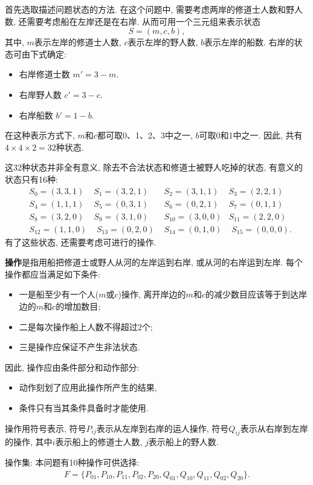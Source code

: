 \begin{result}
首先选取描述问题状态的方法. 在这个问题中, 需要考虑两岸的修道士人数和野人数, 还需要考虑船在左岸还是在右岸. 从而可用一个三元组来表示状态
         $$S=(m, c, b),$$
其中, $m$表示左岸的修道士人数, $c$表示左岸的野人数, $b$表示左岸的船数.
右岸的状态可由下式确定:
\begin{itemize}
\item 右岸修道士数  $m'=3-m$.
\item 右岸野人数   $ c'=3-c$.
\item 右岸船数      $b'=1-b$.
\end{itemize}
在这种表示方式下, $m$和$c$都可取0、1、2、3中之一, $b$可取0和1中之一. 因此, 共有$4\times 4\times 2=32$种状态.

这32种状态并非全有意义, 除去不合法状态和修道士被野人吃掉的状态, 有意义的状态只有16种:
\begin{align*}
        &S_0=(3, 3, 1)  &S_1=(3, 2, 1)     &\,\,S_2=(3, 1, 1)&S_3=(2, 2, 1)\\
        &S_4=(1, 1, 1)  &S_5=(0, 3, 1)     &\,\,S_6=(0, 2, 1)&S_7=(0, 1, 1)\\
        &S_8=(3, 2, 0)  &S_9=(3, 1, 0)     &\,\,S_{10}=(3, 0, 0)&S_{11}=(2, 2, 0)\\
        &S_{12}=(1, 1,0)&\,\,S_{13}=(0, 2, 0)  &\,\,S_{14}=(0, 1, 0)&\,\,S_{15}=(0, 0, 0).
\end{align*}
有了这些状态, 还需要考虑可进行的操作.

\textbf{操作}是指用船把修道士或野人从河的左岸运到右岸, 或从河的右岸运到左岸.
每个操作都应当满足如下条件:
\begin{itemize}
\item 一是船至少有一个人($m$或$c$)操作, 离开岸边的$m$和$c$的减少数目应该等于到达岸边的$m$和$c$的增加数目;
\item 二是每次操作船上人数不得超过2个;
\item 三是操作应保证不产生非法状态.
\end{itemize}
因此, 操作应由条件部分和动作部分:
\begin{itemize}
\item 动作刻划了应用此操作所产生的结果,
\item 条件只有当其条件具备时才能使用.
\end{itemize}
操作用符号表示, 符号$P_{ij}$表示从左岸到右岸的运人操作, 符号$Q_{ij}$表示从右岸到左岸的操作, 其中$i$表示船上的修道士人数, $j$表示船上的野人数.

操作集: 本问题有10种操作可供选择:
\begin{align}
  F=\{P_{01}, P_{10}, P_{11}, P_{02}, P_{20},Q_{01}, Q_{10}, Q_{11}, Q_{02}, Q_{20}\}.
\end{align}


\end{result}
